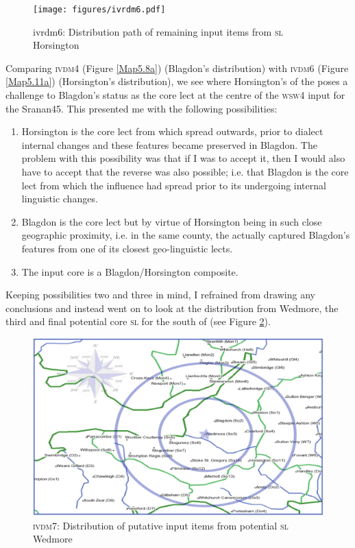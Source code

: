 \begin{figure}
\texttt{[image: figures/ivrdm6.pdf]}
\addtocounter{figure}{-1}\renewcommand{\thefigure}{\arabic{figure}.11b}
\caption {ivrdm6: Distribution path of remaining input items from \textsc{sl} Horsington} 
\label{Map5.11b}
\end{figure}

Comparing \textsc{ivdm4} (Figure \ref{Map5.8a}) (Blagdon's distribution) with \textsc{ivdm6} (Figure \ref{Map5.11a}) (Horsington's distribution), we see where Horsington's  of the  poses a challenge to Blagdon's status as the core lect at the centre of the \textsc{wsw4} input for the Sranan45. This presented me with the following possibilities:

\begin{enumerate}
\item {Horsington is the core lect from which  spread outwards, prior to dialect internal changes and these features became preserved in Blagdon. The problem with this possibility was that if I was to accept it, then I would also have to accept that the reverse was also possible; i.e. that Blagdon is the core lect from which the influence had spread prior to its undergoing internal linguistic changes.}
\item{Blagdon is the core lect but by virtue of Horsington being in such close geographic proximity, i.e. in the same county, the  actually captured Blagdon's features from one of its closest geo-linguistic lects.}
\item{The input core is a Blagdon/Horsington composite.}
\end{enumerate}

Keeping possibilities two and three in mind, I refrained from drawing any conclusions and instead went on to look at the distribution from Wedmore, the third and final potential core \textsc{sl} for the south of  (see Figure \ref{Map5.12}).

\begin{figure}
\includegraphics[width=\textwidth] {figures/ivdm7.pdf}
\addtocounter{figure}{-1}\renewcommand{\thefigure}{\arabic{figure}.12}
\caption {\textsc{ivdm7}: Distribution of putative input items from potential \textsc{sl} Wedmore} 
\label{Map5.12}
\end{figure}


